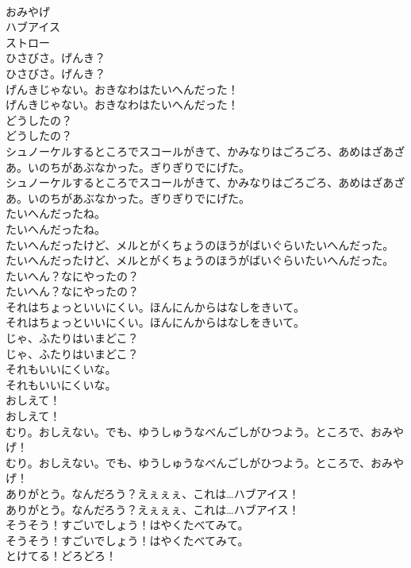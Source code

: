 \documentclass[8pt]{extreport}
\begin{document}
\begin{CJK}{UTF8}{min}
\\	おみやげ
\\	ハブアイス
\\	ストロー
\\	ひさびさ。げんき？	
\\	ひさびさ。げんき？ 
\\	げんきじゃない。おきなわはたいへんだった！	
\\	げんきじゃない。おきなわはたいへんだった！ 
\\	どうしたの？	
\\	どうしたの？ 
\\	シュノーケルするところでスコールがきて、かみなりはごろごろ、あめはざあざあ。いのちがあぶなかった。ぎりぎりでにげた。	
\\	シュノーケルするところでスコールがきて、かみなりはごろごろ、あめはざあざあ。いのちがあぶなかった。ぎりぎりでにげた。 
\\	たいへんだったね。	
\\	たいへんだったね。 
\\	たいへんだったけど、メルとがくちょうのほうがばいぐらいたいへんだった。	
\\	たいへんだったけど、メルとがくちょうのほうがばいぐらいたいへんだった。 
\\	たいへん？なにやったの？	
\\	たいへん？なにやったの？ 
\\	それはちょっといいにくい。ほんにんからはなしをきいて。	
\\	それはちょっといいにくい。ほんにんからはなしをきいて。 
\\	じゃ、ふたりはいまどこ？	
\\	じゃ、ふたりはいまどこ？ 
\\	それもいいにくいな。	
\\	それもいいにくいな。 
\\	おしえて！	
\\	おしえて！ 
\\	むり。おしえない。でも、ゆうしゅうなべんごしがひつよう。ところで、おみやげ！	
\\	むり。おしえない。でも、ゆうしゅうなべんごしがひつよう。ところで、おみやげ！ 
\\	ありがとう。なんだろう？えぇぇぇ、これは…ハブアイス！	
\\	ありがとう。なんだろう？えぇぇぇ、これは…ハブアイス！ 
\\	そうそう！すごいでしょう！はやくたべてみて。	
\\	そうそう！すごいでしょう！はやくたべてみて。 
\\	とけてる！どろどろ！	

\end{CJK}
\end{document}
